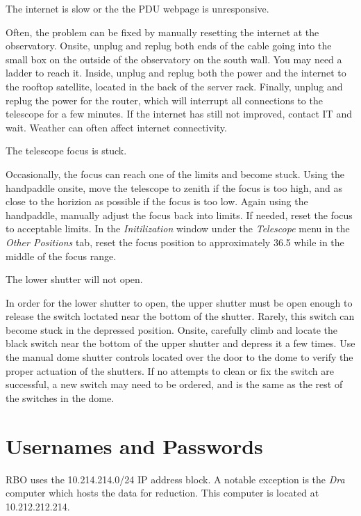 \documentclass[letterpaper,12pt]{article}
\begin{document}
\begin{shaded}\centering
	The internet is slow or the the PDU webpage is unresponsive.
\end{shaded}\noindent
Often, the problem can be fixed by manually resetting the internet at the observatory. Onsite, unplug and replug both ends of the cable going into the small box on the outside of the observatory on the south wall. You may need a ladder to reach it. Inside, unplug and replug both the power and the internet to the rooftop satellite, located in the back of the server rack. Finally, unplug and replug the power for the router, which will interrupt all connections to the telescope for a few minutes. If the internet has still not improved, contact IT and wait. Weather can often affect internet connectivity.

\begin{shaded}\centering
	The telescope focus is stuck.
\end{shaded}\noindent
Occasionally, the focus can reach one of the limits and become stuck. Using the handpaddle onsite, move the telescope to zenith if the focus is too high, and as close to the horizion as possible if the focus is too low. Again using the handpaddle, manually adjust the focus back into limits. If needed, reset the focus to acceptable limits. In the \textit{Initilization} window under the \textit{Telescope} menu in the \textit{Other Positions} tab, reset the focus position to approximately 36.5 while in the middle of the focus range.

\begin{shaded}\centering
	The lower shutter will not open.
\end{shaded}\noindent
In order for the lower shutter to open, the upper shutter must be open enough to release the switch loctated near the bottom of the shutter. Rarely, this switch can become stuck in the depressed position. Onsite, carefully climb and locate the black switch near the bottom of the upper shutter and depress it a few times. Use the manual dome shutter controls located over the door to the dome to verify the proper actuation of the shutters. If no attempts to clean or fix the switch are successful, a new switch may need to be ordered, and is the same as the rest of the switches in the dome.

\newpage

\appendix
\section{Usernames and Passwords}\label{app:users}
RBO uses the 10.214.214.0/24 IP address block. A notable exception is the \textit{Dra} computer which hosts the data for reduction. This computer is located at 10.212.212.214.
\end{document}
